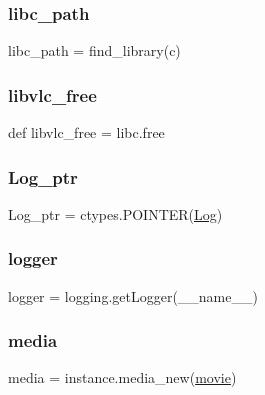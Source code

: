 \mbox{\label{namespacevlc_a7469cfb80443db78c5bf2aaea5ba2f15}} 
\subsubsection{\texorpdfstring{libc\+\_\+path}{libc\_path}}
{\footnotesize\ttfamily libc\+\_\+path = find\+\_\+library(\textquotesingle{}c\textquotesingle{})}

\mbox{\label{namespacevlc_aa77795730bdcb92194198c19c0fb0274}} 
\subsubsection{\texorpdfstring{libvlc\+\_\+free}{libvlc\_free}}
{\footnotesize\ttfamily def libvlc\+\_\+free = libc.\+free}

\mbox{\label{namespacevlc_a6a30cabf154659a9b4616bc59bf46b22}} 
\subsubsection{\texorpdfstring{Log\+\_\+ptr}{Log\_ptr}}
{\footnotesize\ttfamily Log\+\_\+ptr = ctypes.\+P\+O\+I\+N\+T\+ER(\hyperlink{classvlc_1_1_log}{Log})}

\mbox{\label{namespacevlc_a0b14e488ae28d98d262453f3e9cd6e4d}} 
\subsubsection{\texorpdfstring{logger}{logger}}
{\footnotesize\ttfamily logger = logging.\+get\+Logger(\+\_\+\+\_\+name\+\_\+\+\_\+)}

\mbox{\label{namespacevlc_a4ad19ab45fc97cae6d0da6365a6a08a4}} 
\subsubsection{\texorpdfstring{media}{media}}
{\footnotesize\ttfamily media = instance.\+media\+\_\+new(\hyperlink{namespacevlc_ae484bbb4e2af6e2c896075fdb5c69e3e}{movie})}


